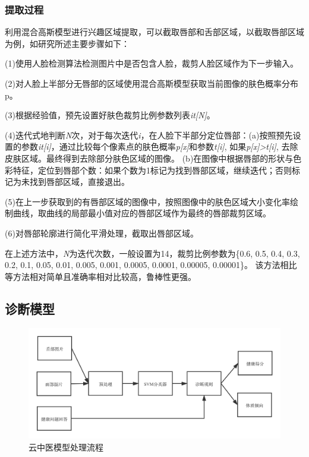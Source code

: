 \subsubsection{提取过程}

利用混合高斯模型进行兴趣区域提取，可以截取唇部和舌部区域，以截取唇部区域为例，如研究\cite{Hu2016Robust}所述主要步骤如下：

(1)使用人脸检测算法检测图片中是否包含人脸，裁剪人脸区域作为下一步输入。

(2)对人脸上半部分无唇部的区域使用混合高斯模型获取当前图像的肤色概率分布p。

(3)根据经验值，预先设置好肤色裁剪比例参数列表\textit{it[N]}。

(4)迭代式地判断\textit{N}次，对于每次迭代\textit{i}，在人脸下半部分定位唇部：(a)按照预先设置的参数\textit{it[i]}，通过比较每个像素点的肤色概率\textit{p[x]}和参数\textit{t[i]}, 如果\textit{p[x]>t[i]}, 去除皮肤区域。最终得到去除部分肤色区域的图像。
(b)在图像中根据唇部的形状与色彩特征，定位到唇部个数：如果个数为1标记为找到唇部区域，继续迭代；否则标记为未找到唇部区域，直接退出。

(5)在上一步获取到的有唇部区域的图像中，按照图像中的肤色区域大小变化率绘制曲线，取曲线的局部最小值对应的唇部区域作为最终的唇部裁剪区域。

(6)对唇部轮廓进行简化平滑处理，截取出唇部区域。

在上述方法中，\textit{N}为迭代次数，一般设置为14，裁剪比例参数为\{0.6, 0.5, 0.4, 0.3, 0.2, 0.1, 0.05, 0.01, 0.005, 0.001, 0.0005, 0.0001, 0.00005, 0.00001\}。
该方法相比\cite{rahman2014lip, li2010automatic, li2020tcminet}等方法相对简单且准确率相对比较高，鲁棒性更强。

\subsection{诊断模型}
\begin{figure}[htb]
    \centering
    \includegraphics[width=15cm]{images/cloud_med.png}
    \caption{云中医模型处理流程}
    \label{cloudmed}
\end{figure}

